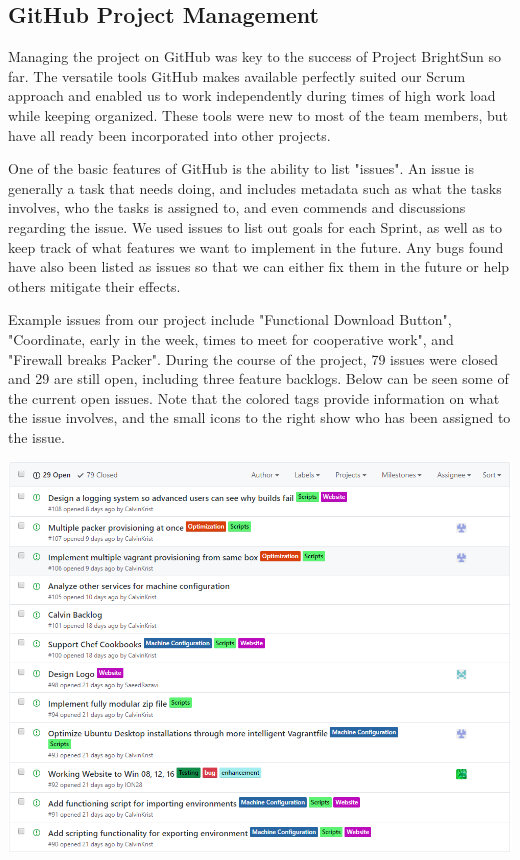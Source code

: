 \documentclass[openright]{report}
\begin{document}
\subsection{GitHub Project Management}

\par Managing the project on GitHub was key to the success of Project BrightSun so far. The versatile tools GitHub makes available perfectly suited our Scrum approach and enabled us to work independently during times of high work load while keeping organized. These tools were new to most of the team members, but have all ready been incorporated into other projects.

\par One of the basic features of GitHub is the ability to list "issues". An issue is generally a task that needs doing, and includes metadata such as what the tasks involves, who the tasks is assigned to, and even commends and discussions regarding the issue. We used issues to list out goals for each Sprint, as well as to keep track of what features we want to implement in the future. Any bugs found have also been listed as issues so that we can either fix them in the future or help others mitigate their effects. 

\par Example issues from our project include "Functional Download Button", "Coordinate, early in the week, times to meet for cooperative work", and "Firewall breaks Packer". During the course of the project, 79 issues were closed and 29 are still open, including three feature backlogs. Below can be seen some of the current open issues. Note that the colored tags provide information on what the issue involves, and the small icons to the right show who has been assigned to the issue.

\begin{center}
    \includegraphics[scale=0.54]{images/issues.png}
\end{center}
\end{document}

